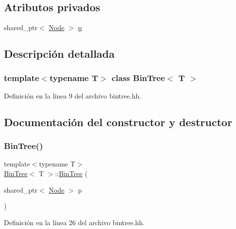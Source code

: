 \subsection*{Atributos privados}
\begin{DoxyCompactItemize}
\item 
shared\+\_\+ptr$<$ \hyperlink{struct_bin_tree_1_1_node}{Node} $>$ \hyperlink{class_bin_tree_afe3647af1dda90f6ddf1deee6560fcf1}{p}
\end{DoxyCompactItemize}


\subsection{Descripción detallada}
\subsubsection*{template$<$typename T$>$\newline
class Bin\+Tree$<$ T $>$}



Definición en la línea 9 del archivo bintree.\+hh.



\subsection{Documentación del constructor y destructor}
\mbox{\label{class_bin_tree_a1408d37d1afda12d99747d09543c15f4}} 
\subsubsection{\texorpdfstring{Bin\+Tree()}{BinTree()}\hspace{0.1cm}{\footnotesize\ttfamily [1/4]}}
{\footnotesize\ttfamily template$<$typename T$>$ \\
\hyperlink{class_bin_tree}{Bin\+Tree}$<$ T $>$\+::\hyperlink{class_bin_tree}{Bin\+Tree} (\begin{DoxyParamCaption}\item[{shared\+\_\+ptr$<$ \hyperlink{struct_bin_tree_1_1_node}{Node} $>$}]{p }\end{DoxyParamCaption})\hspace{0.3cm}{\ttfamily [private]}}



Definición en la línea 26 del archivo bintree.\+hh.



